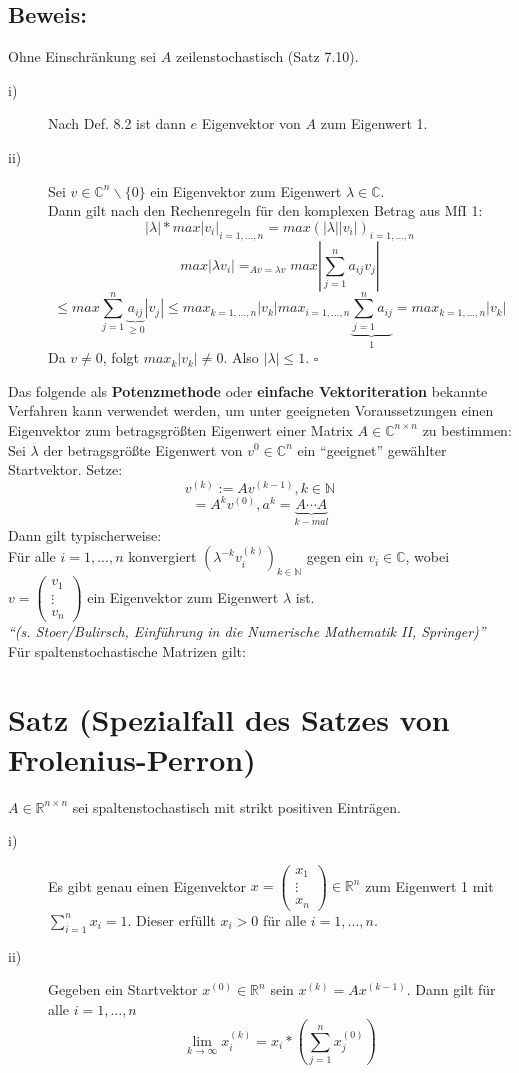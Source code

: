 \documentclass{scrbook}
\begin{document}
\subsection*{Beweis:}
Ohne Einschränkung sei $A$ zeilenstochastisch (Satz 7.10).
\begin{description}
\item[i)] Nach Def. 8.2 ist dann $e$ Eigenvektor von $A$ zum Eigenwert 1.
\item[ii)] Sei $v \in \mathbb{C}^n \backslash \{0\}$ ein Eigenvektor zum Eigenwert $\lambda \in \mathbb{C}$.\\
Dann gilt nach den Rechenregeln für den komplexen Betrag aus MfI 1:\[|\lambda|*max|v_i|_{i=1,...,n} = max(|\lambda||v_i|)_{i=1,...,n}\]
\[max|\lambda v_i| =_{Av=\lambda v} max|\sum^n_{j=1}a_{ij}v_j|\]
\[\leq max \sum^n_{j=1} \underbrace{a_{ij}}_{\geq 0}|v_j| \leq max _{k=1,...,n} |v_k| max _{i=1,...,n} \underbrace{\sum^n_{j=1}a_{ij}}_{1} = max_{k=1,...,n}|v_k|\]
Da $v \neq 0$, folgt $max_k|v_k| \neq 0$. Also $|\lambda|\leq 1$. $\square$
\end{description}
Das folgende als \textbf{Potenzmethode} oder \textbf{einfache Vektoriteration} bekannte Verfahren kann verwendet werden, um unter geeigneten Voraussetzungen einen Eigenvektor zum betragsgrößten Eigenwert einer Matrix $A\in \mathbb{C}^{n\times n}$ zu bestimmen:\\
Sei $\lambda$ der betragsgrößte Eigenwert von $v^{0} \in \mathbb{C}^n$ ein "`geeignet"' gewählter Startvektor. Setze:
\[v^{(k)} := Av^{(k-1)},k\in \mathbb{N}\]\[=A^kv^{(0)},a^k=\underbrace{A\cdots A}_{k-mal}\]
Dann gilt typischerweise:\\
Für alle $i=1,...,n$ konvergiert $(\lambda^{-k}v_i^{(k)})_{k\in \mathbb{N}}$ gegen ein $v_i \in \mathbb{C}$, wobei $v=\left(\begin{array}{c}
v_1\\\vdots\\v_n
\end{array}
\right)$ ein Eigenvektor zum Eigenwert $\lambda$ ist.\\
\textit{"`(s. Stoer/Bulirsch, Einführung in die Numerische Mathematik II, Springer)"'}\\
Für spaltenstochastische Matrizen gilt:
\section{Satz (Spezialfall des Satzes von Frolenius-Perron)}
$A\in \mathbb{R}^{n\times n}$ sei spaltenstochastisch mit strikt positiven Einträgen.
\begin{description}
\item[i)] Es gibt genau einen Eigenvektor $x = \left(\begin{array}{c}x_1\\\vdots\\x_n\end{array}\right) \in \mathbb{R}^n$ zum Eigenwert 1 mit $\sum^n_{i=1} x_i = 1$. Dieser erfüllt $x_i>0$ für alle $i=1,...,n$.
\item[ii)] Gegeben ein Startvektor $x^{(0)} \in \mathbb{R}^n$ sein $x^{(k)} = Ax^{(k-1)}$. Dann gilt für alle $i=1,...,n$\[\lim _{k \to \infty} x^{(k)}_i = x_i *\left(\sum^n_{j=1} x_j^{(0)}\right)\]
\end{description}
\end{document}
